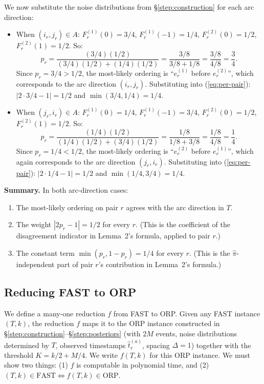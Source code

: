 \documentclass[11pt]{article}
\begin{document}
We now substitute the noise distributions from \S\ref{step:construction} for each arc direction:

\begin{itemize}
\item When $(i_r, j_r) \in A$: $F_r^{(1)}(0) = 3/4$, $F_r^{(1)}(-1) = 1/4$, $F_r^{(2)}(0) = 1/2$, $F_r^{(2)}(1) = 1/2$. So:
\begin{equation}
p_r = \frac{(3/4)(1/2)}{(3/4)(1/2) + (1/4)(1/2)} = \frac{3/8}{3/8 + 1/8} = \frac{3/8}{4/8} = \frac{3}{4}.
\end{equation}
Since $p_r = 3/4 > 1/2$, the most-likely ordering is ``$e_r^{(1)}$ before $e_r^{(2)}$'', which corresponds to the arc direction $(i_r, j_r)$. Substituting into (\ref{eq:per-pair}): $|2 \cdot 3/4 - 1| = 1/2$ and $\min(3/4, 1/4) = 1/4$.

\item When $(j_r, i_r) \in A$: $F_r^{(1)}(0) = 1/4$, $F_r^{(1)}(-1) = 3/4$, $F_r^{(2)}(0) = 1/2$, $F_r^{(2)}(1) = 1/2$. So:
\begin{equation}
p_r = \frac{(1/4)(1/2)}{(1/4)(1/2) + (3/4)(1/2)} = \frac{1/8}{1/8 + 3/8} = \frac{1/8}{4/8} = \frac{1}{4}.
\end{equation}
Since $p_r = 1/4 < 1/2$, the most-likely ordering is ``$e_r^{(2)}$ before $e_r^{(1)}$'', which again corresponds to the arc direction $(j_r, i_r)$. Substituting into (\ref{eq:per-pair}): $|2 \cdot 1/4 - 1| = 1/2$ and $\min(1/4, 3/4) = 1/4$.
\end{itemize}

\noindent\textbf{Summary.} In both arc-direction cases:
\begin{enumerate}
\item The most-likely ordering on pair $r$ agrees with the arc direction in $T$.
\item The weight $|2p_r - 1| = 1/2$ for every $r$. (This is the coefficient of the disagreement indicator in Lemma~2's formula, applied to pair $r$.)
\item The constant term $\min(p_r, 1-p_r) = 1/4$ for every $r$. (This is the $\hat{\pi}$-independent part of pair $r$'s contribution in Lemma~2's formula.)
\end{enumerate}

\subsection{Reducing FAST to ORP}\label{step:reduction}

We define a many-one reduction $f$ from FAST to ORP. Given any FAST instance $(T, k)$, the reduction $f$ maps it to the ORP instance constructed in \S\ref{step:construction}--\S\ref{step:posteriors} (with $2M$ events, noise distributions determined by $T$, observed timestamps $\hat{t}_r^{(a)}$, spacing $\Delta = 1$) together with the threshold $K = k/2 + M/4$. We write $f(T, k)$ for this ORP instance. We must show two things: (1) $f$ is computable in polynomial time, and (2) $(T, k) \in \mathrm{FAST} \iff f(T, k) \in \mathrm{ORP}$.
\end{document}
